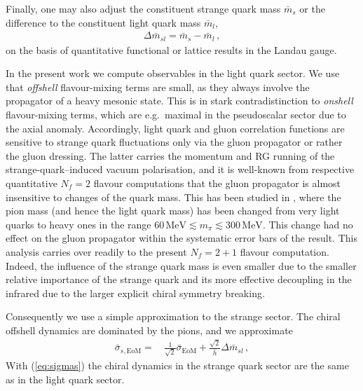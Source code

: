 \documentclass[%
reprint,
superscriptaddress,
showpacs,preprintnumbers,
 amsmath,amssymb,
 aps,
prd,
]{revtex4-1}
\def\eq#1{(\ref{#1})}
\begin{document}
Finally, one may also adjust the constituent strange quark mass
$\bar m_s$ or the difference to the constituent light quark mass
$\bar m_l$,
%
\begin{align}\label{eq:Deltabarmsl}
  \Delta\bar m_{sl}=\bar m_s-\bar m_l\,,
\end{align}
%
on the basis of quantitative functional or lattice results in the
Landau gauge. 

In the present work we compute observables in the light
quark sector. We use that \textit{offshell} flavour-mixing terms
are small, as they always involve the propagator of a heavy mesonic
state. This is in stark contradistinction to \textit{onshell}
flavour-mixing terms, which are e.g.\ maximal in the pseudoscalar
sector due to the axial anomaly. Accordingly, light quark and gluon
correlation functions are sensitive to strange quark fluctuations only
via the gluon propagator or rather the gluon dressing. The latter
carries the momentum and RG running of the strange-quark--induced
vacuum polarisation, and it is well-known from respective quantitative
$N_f=2$ flavour computations that the gluon propagator is almost
insensitive to changes of the quark mass. This has been studied in
\cite{Cyrol:2017qkl}, where the pion mass (and hence the light quark
mass) has been changed from very light quarks to heavy ones in the
range $60\, \textrm{MeV}\lesssim m_\pi \lesssim 300\,
\textrm{MeV}$. This change had no effect on the gluon propagator
within the systematic error bars of the result. This analysis carries
over readily to the present $N_f=2+1$ flavour computation. Indeed, the
influence of the strange quark mass is even smaller due to the smaller
relative importance of the strange quark and its more effective
decoupling in the infrared due to the larger explicit chiral symmetry
breaking.

Consequently we use a simple approximation to the strange sector. The
chiral offshell dynamics are dominated by the pions, and we approximate
%
\begin{align}
\label{eq:sigmas}
  \bar \sigma_{s,\textrm{EoM}} =&\,  \frac{1}{\sqrt{2} }
                                  \bar \sigma_{\textrm{EoM}} +
                                  \frac{\sqrt{2}}{\bar h} \Delta \bar m_{sl}\,, 
\end{align}
%
With \eq{eq:sigmas} the chiral dynamics in the strange quark sector
are the same as in the light quark sector.
\end{document}
